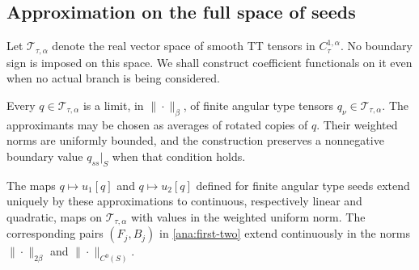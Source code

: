 \subsection{Approximation on the full space of seeds}

Let $\mathscr T_{\tau,\alpha}$ denote the real vector space of smooth
TT tensors in $C^{1,\alpha}_\tau$.  No boundary sign is imposed on
this space.  We shall construct coefficient functionals on it even
when no actual branch is being considered.

\begin{lemma}
\label{lem:rotation}
Every $q\in\mathscr T_{\tau,\alpha}$ is a limit, in $\|\cdot\|_\beta$,
of finite angular type tensors $q_\nu\in\mathscr T_{\tau,\alpha}$.
The approximants may be chosen as averages of rotated copies of $q$.
Their weighted norms are uniformly bounded, and the construction
preserves a nonnegative boundary value $q_{ss}|_S$ when that condition
holds.

The maps $q\mapsto u_1[q]$ and $q\mapsto u_2[q]$ defined for finite
angular type seeds extend uniquely by these approximations to
continuous, respectively linear and quadratic, maps on
$\mathscr T_{\tau,\alpha}$ with values in the weighted uniform norm.
The corresponding pairs $(F_j,B_j)$ in \eqref{ana:first-two}
extend continuously in the norms $\|\cdot\|_{2\beta}$ and
$\|\cdot\|_{C^0(S)}$.
\end{lemma}

